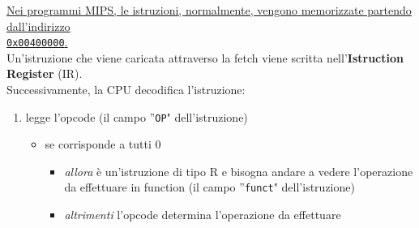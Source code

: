 \documentclass[../main.tex]{subfiles}
\begin{document}
\begin{table}[h!]
\begin{minipage}{.44\linewidth}
\begin{mdframed}[roundcorner=10pt]
        \end{mdframed}
    \end{minipage}
\end{table}

\noindent
\underline{Nei programmi MIPS, le istruzioni, normalmente, vengono
memorizzate partendo dall'indirizzo} \\ \underline{\texttt{0x00400000}.}
\\[2mm]
Un'istruzione che viene caricata attraverso la fetch viene scritta
nell'\textbf{Istruction Register} (IR). \\
Successivamente, la CPU decodifica l'istruzione:
\begin{enumerate}
    \item legge l'opcode (il campo ''\texttt{OP}" dell'istruzione)
    \begin{itemize}
        \item se corrisponde a tutti 0
        \begin{itemize}
            \item \textit{allora} è un'istruzione di tipo R e bisogna
            andare a vedere l'operazione da effettuare in function
            (il campo ''\texttt{funct}" dell'istruzione)
            \item \textit{altrimenti} l'opcode determina l'operazione
            da effettuare
        \end{itemize}
    \end{itemize}
\end{enumerate}

\vspace*{5mm}
\end{document}
